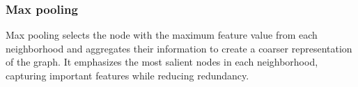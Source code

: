 \subsubsection{Max pooling} Max pooling selects the node with the maximum feature value from each neighborhood and aggregates their information to create a coarser representation of the graph. It emphasizes the most salient nodes in each neighborhood, capturing important features while reducing redundancy.
